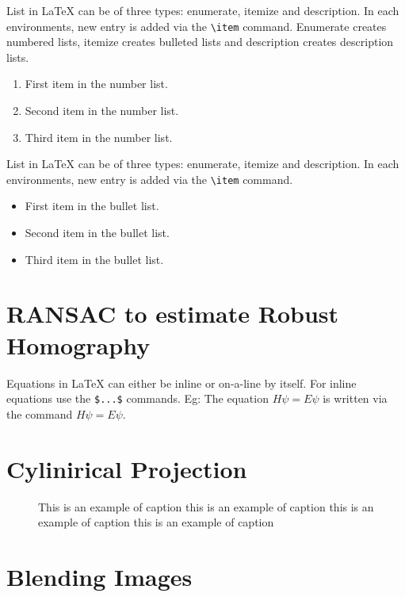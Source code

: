 \documentclass{CUP-JNL-PPS}
\begin{document}
List in \LaTeX{} can be of three types: enumerate, itemize and description.
In each environments, new entry is added via the \verb+\item+ command.
Enumerate creates numbered lists, itemize creates bulleted lists and
description creates description lists.
\begin{enumerate}[1.]
\item First item in the number list.
\item Second item in the number list.
\item Third item in the number list.
\end{enumerate}
List in \LaTeX{} can be of three types: enumerate, itemize and description.
In each environments, new entry is added via the \verb+\item+ command.
\begin{itemize}
\item First item in the bullet list.
\item Second item in the bullet list.
\item Third item in the bullet list.
\end{itemize}


\section{RANSAC to estimate Robust Homography}

Equations in \LaTeX{} can either be inline or on-a-line by itself. For
inline equations use the \verb+$...$+ commands. Eg: The equation
$H\psi = E \psi$ is written via the command $H \psi = E \psi$.



\section{Cylinirical Projection}

\begin{figure}[t]%
{\caption{This is an example of caption this is an example of caption  this is an example of caption this is an example of caption}
\label{fig1}}
\end{figure}

\section{Blending Images}
\end{document}
